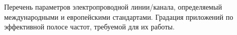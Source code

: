 Перечень параметров электропроводной линии/канала,
определяемый международными и европейскими стандартами.
Градация приложений по эффективной полосе частот,
требуемой для их работы.